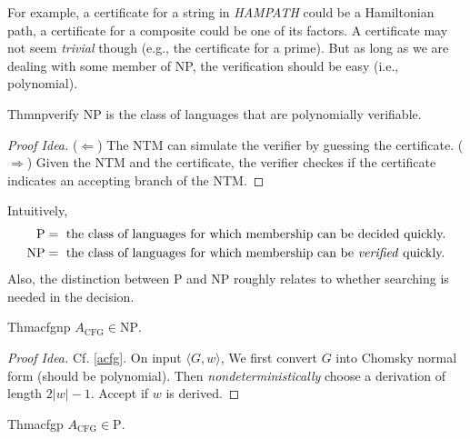 For example, a certificate for a string in \textit{HAMPATH} could be a Hamiltonian path, a certificate for a composite could be one of its factors. A certificate may not seem \textit{trivial} though (e.g., the certificate for a prime). But as long as we are dealing with some member of NP, the verification should be easy (i.e., polynomial).

\begin{reference}{Thm}{npverify}
  NP is the class of languages that are polynomially verifiable.
\end{reference}

\begin{proof}[Proof Idea]
  ($\Leftarrow$) The NTM can simulate the verifier by guessing the certificate.\newline
  ($\Rightarrow$) Given the NTM and the certificate, the verifier checkes if the certificate indicates an accepting branch of the NTM.
\end{proof}

Intuitively,
\begin{align*}
  \mathrm{P}  & =\text{ the class of languages for which membership can be decided quickly.}           \\
  \mathrm{NP} & =\text{ the class of languages for which membership can be \textit{verified} quickly.}
\end{align*}
Also, the distinction between P and NP roughly relates to whether searching is needed in the decision.

\begin{reference}{Thm}{acfgnp}
  $A_{\mathrm{CFG}}\in \mathrm{NP}$.
\end{reference}

\begin{proof}[Proof Idea]
  Cf. \ref{acfg}. On input $\langle G,w\rangle$, We first convert $G$ into Chomsky normal form (should be polynomial). Then \textit{nondeterministically} choose a derivation of length $2|w|-1$. Accept if $w$ is derived.
\end{proof}

\begin{reference}{Thm}{acfgp}
  $A_{\mathrm{CFG}}\in \mathrm{P}$.
\end{reference}

